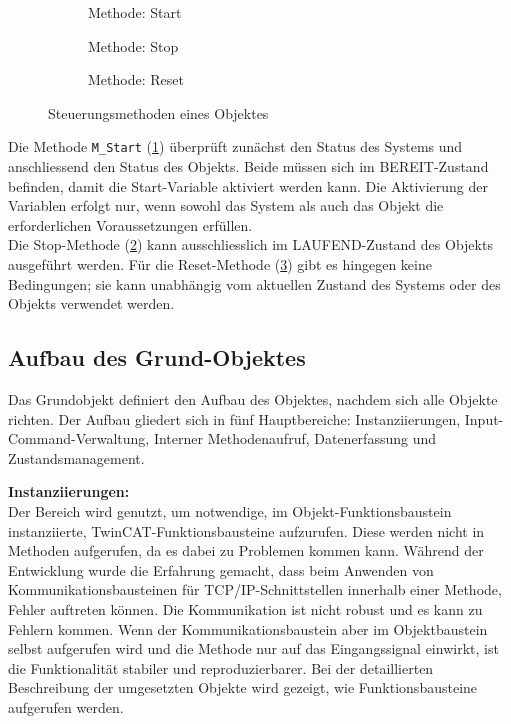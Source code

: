 		\begin{figure}[h!]
			\centering
			\begin{subfigure}[b]{0.4\textwidth}
				\centering
				\caption{Methode: Start}
				\label{fig:Objekt_MStart}
			\end{subfigure}
			\hfill
			\begin{subfigure}[b]{0.3\textwidth}
				\centering
				\caption{Methode: Stop}
				\label{fig:Objekt_MStop}
			\end{subfigure}
			\hfill
			\begin{subfigure}[b]{0.2\textwidth}
				\centering
				\caption{Methode: Reset}
				\label{fig:Objekt_MReset}
			\end{subfigure}
			\caption{Steuerungsmethoden eines Objektes}
			\label{fig:Steuerungsmethoden_Objekt}
		\end{figure} 
		
		Die Methode \verb|M_Start| (\ref{fig:Objekt_MStart}) überprüft zunächst den Status des Systems und anschliessend den Status des Objekts. Beide müssen sich im BEREIT-Zustand befinden, damit die Start-Variable aktiviert werden kann. Die Aktivierung der Variablen erfolgt nur, wenn sowohl das System als auch das Objekt die erforderlichen Voraussetzungen erfüllen.
		\\
		Die Stop-Methode (\ref{fig:Objekt_MStop}) kann ausschliesslich im LAUFEND-Zustand des Objekts ausgeführt werden. Für die Reset-Methode (\ref{fig:Objekt_MReset}) gibt es hingegen keine Bedingungen; sie kann unabhängig vom aktuellen Zustand des Systems oder des Objekts verwendet werden.
		
		\newpage
		
	\subsection{Aufbau des Grund-Objektes} \label{Grundobjekt_Aufbau}
		Das Grundobjekt definiert den Aufbau des Objektes, nachdem sich alle Objekte richten. Der Aufbau gliedert sich in fünf Hauptbereiche: Instanziierungen, Input-Command-Verwaltung, Interner Methodenaufruf, Datenerfassung und Zustandsmanagement.  
		
		\textbf{Instanziierungen:}
		\vspace{2mm} 
		\\
		Der Bereich wird genutzt, um notwendige, im Objekt-Funktionsbaustein instanziierte, TwinCAT-Funktionsbausteine aufzurufen. Diese werden nicht in Methoden aufgerufen, da es dabei zu Problemen kommen kann. Während der Entwicklung wurde die Erfahrung gemacht, dass beim Anwenden von Kommunikationsbausteinen für TCP/IP-Schnittstellen innerhalb einer Methode, Fehler auftreten können. Die Kommunikation ist nicht robust und es kann zu Fehlern kommen. Wenn der Kommunikationsbaustein aber im Objektbaustein selbst aufgerufen wird und die Methode nur auf das Eingangssignal einwirkt, ist die Funktionalität stabiler und reproduzierbarer. Bei der detaillierten Beschreibung der umgesetzten Objekte wird gezeigt, wie Funktionsbausteine aufgerufen werden. 
		
